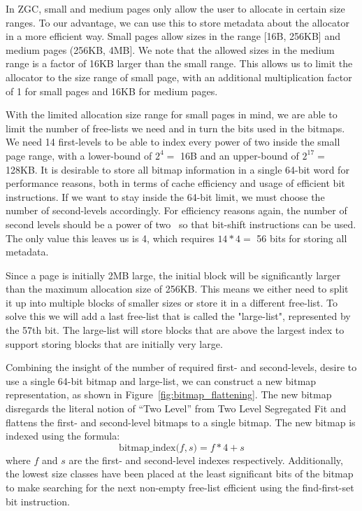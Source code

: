 In ZGC, small and medium pages only allow the user to allocate in certain size ranges. To our advantage, we can use this to store metadata about the allocator in a more efficient way. Small pages allow sizes in the range [16B, 256KB] and medium pages (256KB, 4MB]. We note that the allowed sizes in the medium range is a factor of 16KB larger than the small range. This allows us to limit the allocator to the size range of small page, with an additional multiplication factor of 1 for small pages and 16KB for medium pages.

With the limited allocation size range for small pages in mind, we are able to limit the number of free-lists we need and in turn the bits used in the bitmaps. We need 14 first-levels to be able to index every power of two inside the small page range, with a lower-bound of $2^4 =$ 16B and an upper-bound of $2^{17} =$ 128KB. It is desirable to store all bitmap information in a single 64-bit word for performance reasons, both in terms of cache efficiency and usage of efficient bit instructions. If we want to stay inside the 64-bit limit, we must choose the number of second-levels accordingly. For efficiency reasons again, the number of second levels should be a power of two~\cite{TLSF} so that bit-shift instructions can be used. The only value this leaves us is 4, which requires $14 * 4 =$ 56 bits for storing all metadata.

Since a page is initially 2MB large, the initial block will be significantly larger than the maximum allocation size of 256KB. This means we either need to split it up into multiple blocks of smaller sizes or store it in a different free-list. To solve this we will add a last free-list that is called the "large-list", represented by the 57th bit. The large-list will store blocks that are above the largest index to support storing blocks that are initially very large.

Combining the insight of the number of required first- and second-levels, desire to use a single 64-bit bitmap and large-list, we can construct a new bitmap representation, as shown in Figure~\ref{fig:bitmap_flattening}. The new bitmap disregards the literal notion of ``Two Level'' from Two Level Segregated Fit and flattens the first- and second-level bitmaps to a single bitmap. The new bitmap is indexed using the formula: 
\[
    \text{bitmap\_index($f, s$)} = f * 4 + s
\]
where $f$ and $s$ are the first- and second-level indexes respectively. Additionally, the lowest size classes have been placed at the least significant bits of the bitmap to make searching for the next non-empty free-list efficient using the find-first-set bit instruction.


